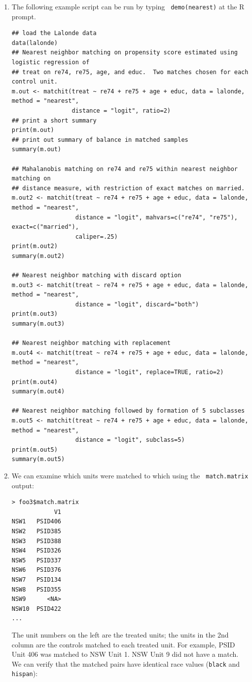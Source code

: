 \documentclass[oneside,letterpaper,titlepage]{article}
\begin{document}
\begin{enumerate}
\item The following example script can be run by typing {\tt
    demo(nearest)} at the R prompt.

\begin{verbatim}
## load the Lalonde data
data(lalonde)
## Nearest neighbor matching on propensity score estimated using logistic regression of
## treat on re74, re75, age, and educ.  Two matches chosen for each control unit.
m.out <- matchit(treat ~ re74 + re75 + age + educ, data = lalonde, method = "nearest", 
                 distance = "logit", ratio=2)
## print a short summary
print(m.out)
## print out summary of balance in matched samples
summary(m.out)

## Mahalanobis matching on re74 and re75 within nearest neighbor matching on 
## distance measure, with restriction of exact matches on married.
m.out2 <- matchit(treat ~ re74 + re75 + age + educ, data = lalonde, method = "nearest", 
                  distance = "logit", mahvars=c("re74", "re75"), exact=c("married"), 
                  caliper=.25)
print(m.out2)
summary(m.out2)

## Nearest neighbor matching with discard option
m.out3 <- matchit(treat ~ re74 + re75 + age + educ, data = lalonde, method = "nearest", 
                  distance = "logit", discard="both")
print(m.out3)
summary(m.out3)

## Nearest neighbor matching with replacement
m.out4 <- matchit(treat ~ re74 + re75 + age + educ, data = lalonde, method = "nearest", 
                  distance = "logit", replace=TRUE, ratio=2)
print(m.out4)
summary(m.out4)

## Nearest neighbor matching followed by formation of 5 subclasses
m.out5 <- matchit(treat ~ re74 + re75 + age + educ, data = lalonde, method = "nearest", 
                  distance = "logit", subclass=5)
print(m.out5)
summary(m.out5)
\end{verbatim}

\item We can examine which units were matched to which using the {\tt
    match.matrix} output:
\begin{verbatim}
> foo3$match.matrix
            V1
NSW1   PSID406
NSW2   PSID385
NSW3   PSID388
NSW4   PSID326
NSW5   PSID337
NSW6   PSID376
NSW7   PSID134
NSW8   PSID355
NSW9      <NA>
NSW10  PSID422
...  
\end{verbatim}  

The unit numbers on the left are the treated units; the units in the
2nd column are the controls matched to each treated unit.  For
example, PSID Unit 406 was matched to NSW Unit 1.  NSW Unit 9 did not
have a match.  We can verify that the matched pairs have identical
race values (\texttt{black} and \texttt{hispan}):


\end{enumerate}
\end{document}
